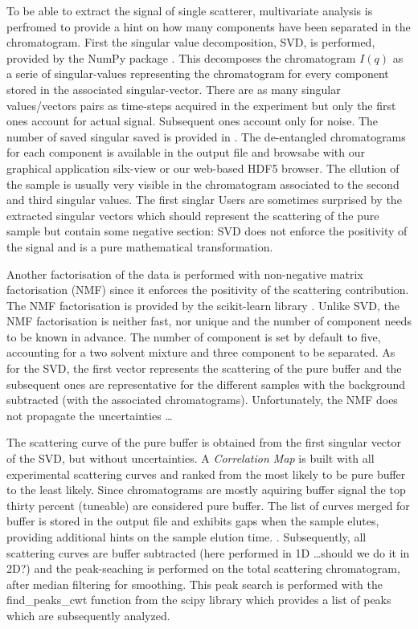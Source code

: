 \documentclass[preprint]{iucr}              %
\begin{document}
To be able to extract the signal of single scatterer, multivariate analysis is perfromed to provide a hint on how many components
have been separated in the chromatogram. 
First the singular value decomposition, SVD, is performed, provided by the NumPy package \cite{numpy}.
This decomposes the chromatogram $I(q)$ as a serie of singular-values representing the chromatogram for every component stored in the
associated singular-vector. 
There are as many singular values/vectors pairs as time-steps acquired in the experiment but only the first ones account for actual signal.
Subsequent ones account only for noise. 
The number of saved singular saved is provided in \cite{svd_threshold}.
The de-entangled chromatograms for each component is available in the output file and browsabe with our graphical application silx-view or our web-based HDF5 browser.
The ellution of the sample is usually very visible in the chromatogram associated to the second and third singular values.
The first singlar  
Users are sometimes surprised by the extracted singular vectors which should represent the scattering of the pure sample 
but contain some negative section: SVD does not enforce the positivity of the signal and is a pure mathematical transformation.

Another factorisation of the data is performed with non-negative matrix factorisation (NMF) since it enforces the positivity
of the scattering contribution. 
The NMF factorisation is provided by the scikit-learn library \cite{sklearn}.
Unlike SVD, the NMF factorisation is neither fast, nor unique and the number of component needs to be known in advance.
The number of component is set by default to five, accounting for a two solvent mixture and three component to be separated.   
As for the SVD, the first vector represents the scattering of the pure buffer and the subsequent ones 
are representative for the different samples with the background subtracted (with the associated chromatograms).
Unfortunately, the NMF does not propagate the uncertainties \ldots

The scattering curve of the pure buffer is obtained from the first singular vector of the SVD, but without uncertainties.
A \textit{Correlation Map} is built with all experimental scattering curves and ranked from the  most likely to be pure buffer
to the least likely. 
Since chromatograms are mostly aquiring buffer signal the top thirty percent (tuneable) are considered pure buffer.
The list of curves merged for buffer is stored in the output file and exhibits gaps when the sample elutes, 
providing additional hints on the sample elution time. .    
Subsequently, all scattering curves are buffer subtracted (here performed in 1D \ldots should we do it in 2D?) and the
peak-seaching is performed on the total scattering chromatogram, after median filtering for smoothing.
This peak search is performed with the find_peaks_cwt function from the scipy library \cite{scipy} which provides a
list of peaks which are subsequently analyzed.
\end{document}
